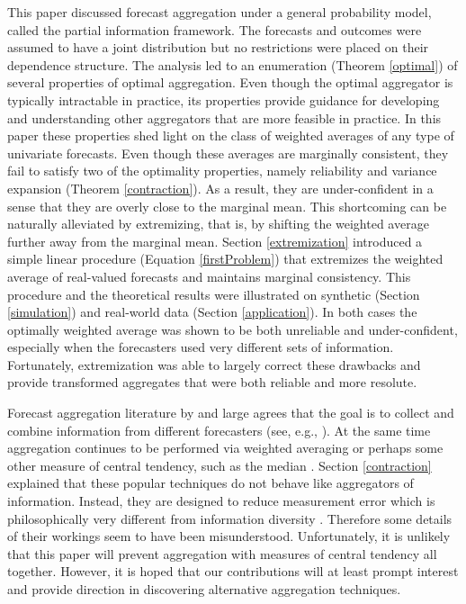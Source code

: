 \documentclass[12pt]{article}
\theoremstyle{definition}
\theoremstyle{definition}
\begin{document}
This paper discussed forecast aggregation under a general probability model, called the partial information framework. The forecasts and outcomes were assumed to have a joint distribution but no restrictions were placed on their dependence structure. The analysis led to an enumeration (Theorem \ref{optimal}) of several properties of optimal aggregation. Even though the optimal aggregator is typically intractable in practice, its properties provide guidance for developing and understanding other aggregators that are more feasible in practice. In this paper these properties shed light on the class of weighted averages of any type of univariate forecasts. Even though these averages are marginally consistent, they fail to satisfy two of the optimality properties, namely reliability and variance expansion (Theorem \ref{contraction}). As a result, they are under-confident in a sense that they are overly close to the marginal mean. This shortcoming can be naturally alleviated by extremizing, that is, by shifting the weighted average further away from the marginal mean.  Section \ref{extremization} introduced a simple linear procedure (Equation \ref{firstProblem}) that extremizes the weighted average of real-valued forecasts and maintains marginal consistency. This procedure and the theoretical results were illustrated on synthetic (Section \ref{simulation}) and real-world data (Section \ref{application}). In both cases the optimally weighted average was shown to be both unreliable and under-confident, especially when the forecasters used very different sets of information. Fortunately, extremization was able to largely correct these drawbacks and provide transformed aggregates that were both reliable and more resolute. 


Forecast aggregation literature by and large agrees that the goal is to collect and combine  information from different forecasters (see, e.g., \citealt{dawid1995coherent, armstrong2, forlines2012heuristics}). At the same time aggregation continues to be performed via weighted averaging or perhaps some other measure of central tendency, such as the median \citep{levins1966strategy, armstrong2, lobo2010human}. Section \ref{contraction} explained that these popular techniques do not behave like aggregators of information. Instead, they are designed to reduce measurement error which is philosophically very different from information diversity \citep{satopaamodeling2}. Therefore some details of their workings seem to have been misunderstood. Unfortunately, it is unlikely that this paper will prevent aggregation with measures of central tendency all together. However, it is hoped that our contributions will at least prompt interest and provide direction in discovering alternative aggregation techniques. 
\end{document}
